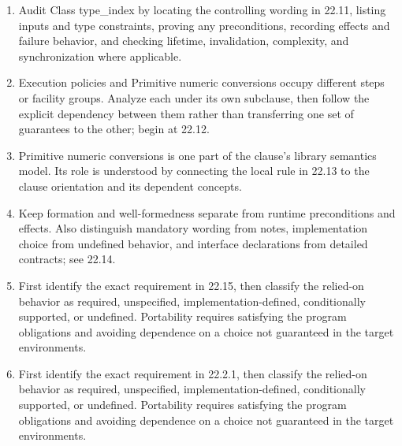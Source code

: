 \documentclass[11pt,letterpaper]{article}
\begin{document}
\begin{enumerate}
\item Audit Class type\_\allowbreak{}index by locating the controlling wording in 22.11, listing inputs and type constraints, proving any preconditions, recording effects and failure behavior, and checking lifetime, invalidation, complexity, and synchronization where applicable.
\item Execution policies and Primitive numeric conversions occupy different steps or facility groups. Analyze each under its own subclause, then follow the explicit dependency between them rather than transferring one set of guarantees to the other; begin at 22.12.
\item Primitive numeric conversions is one part of the clause's library semantics model. Its role is understood by connecting the local rule in 22.13 to the clause orientation and its dependent concepts.
\item Keep formation and well-formedness separate from runtime preconditions and effects. Also distinguish mandatory wording from notes, implementation choice from undefined behavior, and interface declarations from detailed contracts; see 22.14.
\item First identify the exact requirement in 22.15, then classify the relied-on behavior as required, unspecified, implementation-defined, conditionally supported, or undefined. Portability requires satisfying the program obligations and avoiding dependence on a choice not guaranteed in the target environments.
\item First identify the exact requirement in 22.2.1, then classify the relied-on behavior as required, unspecified, implementation-defined, conditionally supported, or undefined. Portability requires satisfying the program obligations and avoiding dependence on a choice not guaranteed in the target environments.
\end{enumerate}
\end{document}

